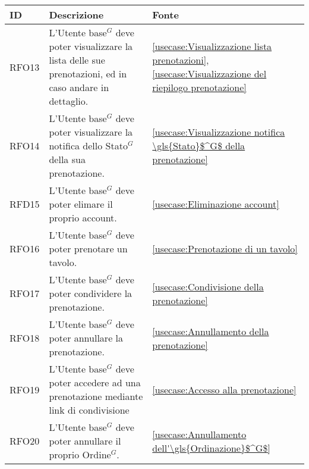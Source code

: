 \begin{table}[H]
	\renewcommand{\arraystretch}{1.5}
	\centering
	\begin{tabularx}{\textwidth}{l|X|p{2cm}}
		\textbf{ID} & \textbf{Descrizione}                                                                                           & \textbf{Fonte}                                                              \\
		\hline
		RFO13       & L'\gls{Utente base}$^G$ deve poter visualizzare la lista delle sue prenotazioni, ed in caso andare in dettaglio.          & \autoref{usecase:Visualizzazione lista prenotazioni}, \autoref{usecase:Visualizzazione del riepilogo prenotazione}                \\
		\hline
		RFO14       & L'\gls{Utente base}$^G$ deve poter visualizzare la notifica dello \gls{Stato}$^G$ della sua prenotazione.                          & \autoref{usecase:Visualizzazione notifica \gls{Stato}$^G$ della prenotazione}         \\
		\hline
		RFD15       & L'\gls{Utente base}$^G$ deve poter elimare il proprio account.                                                           & \autoref{usecase:Eliminazione account}                                      \\
		\hline
		RFO16       & L'\gls{Utente base}$^G$ deve poter prenotare un tavolo.                                                                  & \autoref{usecase:Prenotazione di un tavolo}                                 \\
		\hline
		RFO17       & L'\gls{Utente base}$^G$ deve poter condividere la prenotazione.                                                          & \autoref{usecase:Condivisione della prenotazione}                           \\
		\hline
		RFO18       & L'\gls{Utente base}$^G$ deve poter annullare la prenotazione.                                                            & \autoref{usecase:Annullamento della prenotazione}                           \\
		\hline
		RFO19       & L'\gls{Utente base}$^G$ deve poter accedere ad una prenotazione mediante link di condivisione                            & \autoref{usecase:Accesso alla prenotazione}                                 \\
		\hline
		RFO20       & L'\gls{Utente base}$^G$ deve poter annullare il proprio \gls{Ordine}$^G$.                                                          & \autoref{usecase:Annullamento dell'\gls{Ordinazione}$^G$}                             \\

\end{tabularx}
\end{table}
